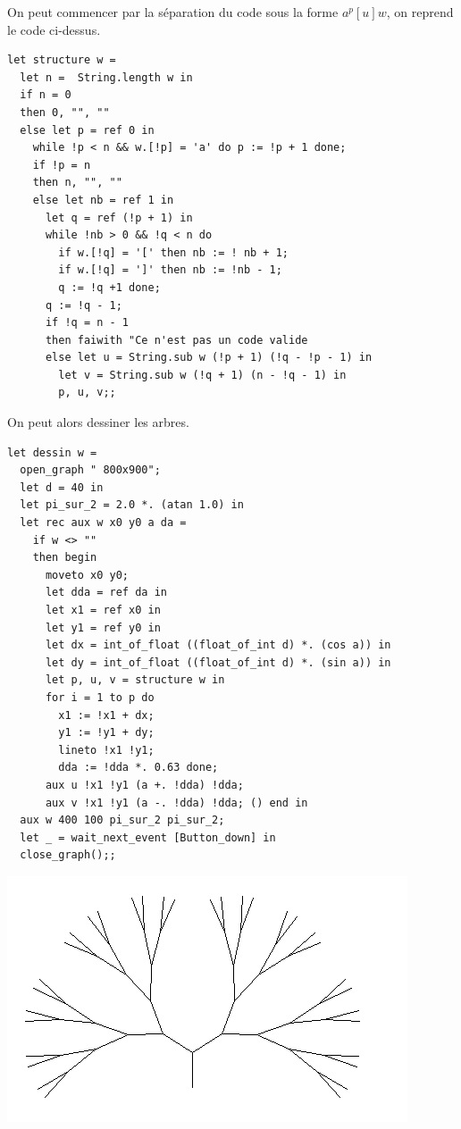 \begin{Exercise}
On peut commencer par la séparation du code sous la forme $a^p[u]w$, on reprend le code ci-dessus.
\begin{lstlisting}
let structure w =
  let n =  String.length w in
  if n = 0
  then 0, "", ""
  else let p = ref 0 in
    while !p < n && w.[!p] = 'a' do p := !p + 1 done;
    if !p = n
    then n, "", ""
    else let nb = ref 1 in
      let q = ref (!p + 1) in
      while !nb > 0 && !q < n do
        if w.[!q] = '[' then nb := ! nb + 1;
        if w.[!q] = ']' then nb := !nb - 1;
        q := !q +1 done;
      q := !q - 1;
      if !q = n - 1
      then faiwith "Ce n'est pas un code valide
      else let u = String.sub w (!p + 1) (!q - !p - 1) in
        let v = String.sub w (!q + 1) (n - !q - 1) in
        p, u, v;;
\end{lstlisting}

\newpage
 On peut alors dessiner les arbres.
\begin{lstlisting}
let dessin w =
  open_graph " 800x900";
  let d = 40 in
  let pi_sur_2 = 2.0 *. (atan 1.0) in
  let rec aux w x0 y0 a da =
    if w <> "" 
    then begin
      moveto x0 y0;
      let dda = ref da in
      let x1 = ref x0 in
      let y1 = ref y0 in
      let dx = int_of_float ((float_of_int d) *. (cos a)) in
      let dy = int_of_float ((float_of_int d) *. (sin a)) in
      let p, u, v = structure w in
      for i = 1 to p do
        x1 := !x1 + dx;
        y1 := !y1 + dy;
        lineto !x1 !y1;
        dda := !dda *. 0.63 done;
      aux u !x1 !y1 (a +. !dda) !dda;
      aux v !x1 !y1 (a -. !dda) !dda; () end in
  aux w 400 100 pi_sur_2 pi_sur_2;
  let _ = wait_next_event [Button_down] in
  close_graph();;
\end{lstlisting}
\includegraphics[scale=0.6]{parfait6}
\end{Exercise}


